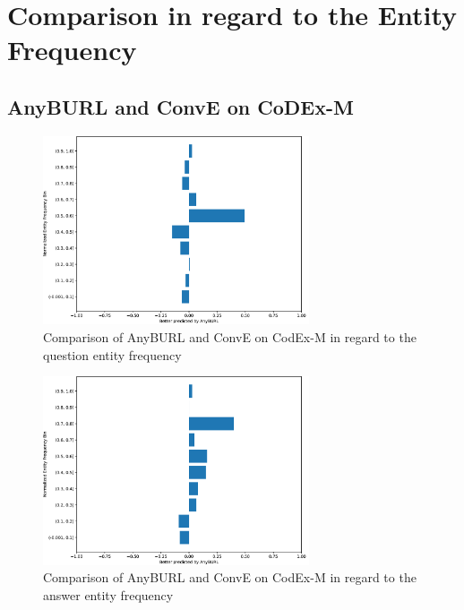 \section{Comparison in regard to the Entity Frequency}
\label{appendix:comparison_entity_freq}

\subsection{AnyBURL and ConvE on CoDEx-M}

\begin{figure}[H]
\centering
\includegraphics[width=0.7\textwidth]{images/entity_freq_question_anyburl_conve_codex.PNG}
\caption{Comparison of AnyBURL and ConvE on CodEx-M in regard to the question entity frequency}
\label{fig:entity_question_tail_anyburl_conve_codex}
\end{figure}

\begin{figure}[H]
\centering
\includegraphics[width=0.7\textwidth]{images/entity_freq_answer_anyburl_conve_codex.PNG}
\caption{Comparison of AnyBURL and ConvE on CodEx-M in regard to the answer entity frequency}
\label{fig:entity_answer_tail_anyburl_conve_codex}
\end{figure}

